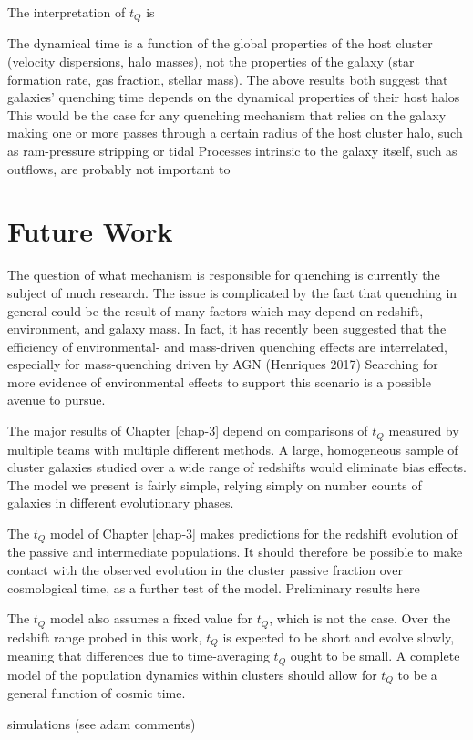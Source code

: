 The interpretation of $t_Q$ is

The dynamical time is a function of the global properties of the host cluster (velocity dispersions, halo masses), not the properties of the galaxy (star formation rate, gas fraction, stellar mass).
The above results both suggest that galaxies' quenching time depends on the dynamical properties of their host halos
This would be the case for any quenching mechanism that relies on the galaxy making one or more passes through a certain radius of the host cluster halo, such as ram-pressure stripping or tidal
Processes intrinsic to the galaxy itself, such as outflows, are probably not important to

\section{Future Work}

The question of what mechanism is responsible for quenching is currently the subject of much research.
The issue is complicated by the fact that quenching in general could be the result of many factors which may depend on redshift, environment, and galaxy mass.
In fact, it has recently been suggested that the efficiency of environmental- and mass-driven quenching effects are interrelated, especially for mass-quenching driven by AGN (Henriques 2017)
Searching for more evidence of environmental effects to support this scenario is a possible avenue to pursue.

The major results of Chapter \ref{chap-3} depend on comparisons of $t_Q$ measured by multiple teams with multiple different methods.
A large, homogeneous sample of cluster galaxies studied over a wide range of redshifts would eliminate bias effects.
The model we present is fairly simple, relying simply on number counts of galaxies in different evolutionary phases.


The $t_Q$ model of Chapter \ref{chap-3} makes predictions for the redshift evolution of the passive and intermediate populations.
It should therefore be possible to make contact with the observed evolution in the cluster passive fraction over cosmological time, as a further test of the model.
Preliminary results here

The $t_Q$ model also assumes a fixed value for $t_Q$, which is not the case.
Over the redshift range probed in this work, $t_Q$ is expected to be short and evolve slowly, meaning that differences due to time-averaging $t_Q$ ought to be small.
A complete model of the population dynamics within clusters should allow for $t_Q$ to be a general function of cosmic time.


simulations (see adam comments)
